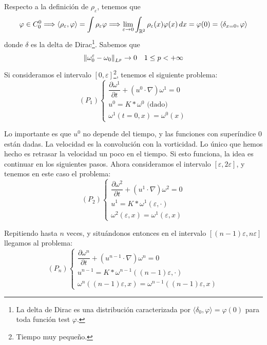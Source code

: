 Respecto a la definición de $\rho_\varepsilon$, tenemos que 
$$\varphi \in C_0^0 \Longrightarrow \langle \rho_\varepsilon, \varphi \rangle = \int \rho_\varepsilon \varphi \Longrightarrow \lim\limits_{\varepsilon \to 0} \int_{\mathbb{R}^2} \rho_\varepsilon(x) \varphi(x)\,dx = \varphi(0) = \langle \delta_{x = 0}, \varphi \rangle$$
donde $\delta$ es la delta de Dirac\footnote{La delta de Dirac es una distribución caracterizada por $\langle \delta_0,\varphi\rangle=\varphi(0)$ para toda función test $\varphi$.}.
Sabemos que 
$$\left\lVert \omega_0^\varepsilon - \omega_0 \right\rVert_{L^p} \to 0 \quad 1 \leq p < +\infty$$
Si consideramos el intervalo $[0, \varepsilon]$\footnote{Tiempo muy pequeño.}, tenemos el siguiente problema:
\begin{equation}
    (P_1) \begin{cases}
        \dfrac{\partial \omega^1}{\partial t} + (u^0 \cdot \nabla) \omega^1 = 0 \\
        u^0 = K \ast \omega^0 \text{ (dado)}\\
        \omega^1(t=0,x) = \omega^0(x)
    \end{cases}
\end{equation}

Lo importante es que $u^0$ no depende del tiempo, y las funciones con superíndice $0$ están dadas. La velocidad es la convolución con la vorticidad.
Lo único que hemos hecho es retrasar la velocidad un poco en el tiempo. Si esto funciona, la idea es continuar en los siguientes pasos. Ahora consideramos
el intervalo $[\varepsilon, 2 \varepsilon]$, y tenemos en este caso el problema:
\begin{equation}
    (P_2) \begin{cases}
        \dfrac{\partial \omega^2}{\partial t} + (u^1 \cdot \nabla) \omega^2 = 0 \\
        u^1 = K \ast \omega^1(\varepsilon, \cdot)\\
        \omega^2(\varepsilon,x) = \omega^1(\varepsilon, x)
    \end{cases}
\end{equation}

Repitiendo hasta $n$ veces, y situándonos entonces en el intervalo $[(n-1)\varepsilon, n \varepsilon]$ llegamos al problema:
\begin{equation}
    (P_n) \begin{cases}
        \dfrac{\partial \omega^n}{\partial t} + (u^{n-1} \cdot \nabla) \omega^n = 0 \\
        u^{n-1} = K \ast \omega^{n-1}((n-1)\varepsilon, \cdot)\\
        \omega^n((n-1)\varepsilon,x) = \omega^{n-1}((n-1)\varepsilon, x)
    \end{cases}
\end{equation}

